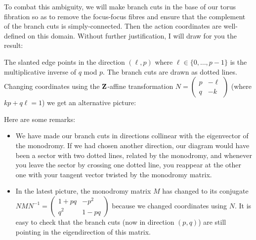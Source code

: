 \documentclass{article}
\begin{document}
To combat this ambiguity, we will make branch cuts in the base of our
torus fibration so as to remove the focus-focus fibres and ensure that
the complement of the branch cuts is simply-connected. Then the action
coordinates are well-defined on this domain. Without further
justification, I will draw for you the result:


\begin{center}
\end{center}
The slanted edge points in the direction \((\ell,p)\) where
\(\ell\in\{0,\ldots,p-1\}\) is the multiplicative inverse of \(q\) mod
\(p\). The branch cuts are drawn as dotted lines. Changing coordinates
using the \(\mathbf{Z}\)-affine transformation \(N=\begin{pmatrix} p & -\ell
\\ q & -k\end{pmatrix}\) (where \(kp+q\ell=1\)) we get an alternative
picture:


\begin{center}
\end{center}
Here are some remarks:
\begin{itemize}
\item We have made our branch cuts in directions collinear with the
eigenvector of the monodromy. If we had chosen another direction,
our diagram would have been a sector with two dotted lines, related
by the monodromy, and whenever you leave the sector by crossing one
dotted line, you reappear at the other one with your tangent vector
twisted by the monodromy matrix.
\item In the latest picture, the monodromy matrix \(M\) has changed to its
conjugate \(NMN^{-1}=\begin{pmatrix}1+pq & -p^2 \\ q^2 &
1-pq\end{pmatrix}\) because we changed coordinates using \(N\). It
is easy to check that the branch cuts (now in direction \((p,q)\))
are still pointing in the eigendirection of this matrix.


\end{itemize}
\end{document}
